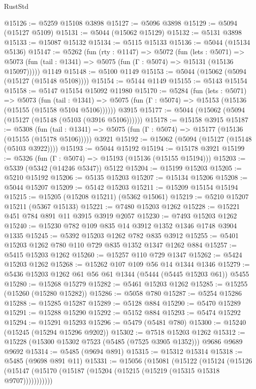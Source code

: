 \begin{lexlean}{RustStd}
\begin{coremodule}
@15126 := @5259 @15108 @3898
@15127 := @5096 @3898
@15129 := @5094 (@15127 @5109)
@15131 := @5044 (@15062 @15129)
@15132 := @5131 @3898
@15133 := @15087 @15132
@15134 := @5115 @15133
@15136 := @5044 (@15134 @5136)
@15147 := @5262
    (fun (rty : @1147) =>
    @5072
      (fun (lets : @5071) =>
      @5073 (fun (tail : @1341) => @5075 (fun (Γ : @5074) => @15131 (@15136 @15097)))))
    @1149
@15148 := @5100 @1149
@15153 := @5044 (@15062 (@5094 (@15127 (@15148 @5108))))
@15154 := @5144 @1149
@15155 := @5143 @15154
@15158 := @5147 @15154 @15092 @11980
@15170 := @5284
    (fun (lets : @5071) =>
    @5073
      (fun (tail : @1341) =>
      @5075 (fun (Γ : @5074) => @15153 (@15136 (@15155 (@15158 @5104 @5106))))))
    @3915
@15177 := @5044 (@15062 (@5094 (@15127 (@15148 (@5103 (@3916 @5106))))))
@15178 := @15158 @3915
@15187 := @5308
    (fun (tail : @1341) => @5075 (fun (Γ : @5074) => @15177 (@15136 (@15155 (@15178 @5106)))))
    @3921
@15192 := @15062 (@5094 (@15127 (@15148 (@5103 @3922))))
@15193 := @5044 @15192
@15194 := @15178 @3921
@15199 := @5326 (fun (Γ : @5074) => @15193 (@15136 (@15155 @15194)))
@15203 := @5339 (@5342 (@14246 @5347)) @5122
@15204 := @15199 @15203
@15205 := @5210 @15192
@15206 := @5135 @15203
@15207 := @15134 @15206
@15208 := @5044 @15207
@15209 := @5142 @15203
@15211 := @15209 @15154 @15194
@15215 := @15205 (@15208 @15211) (@5362 @15061)
@15219 := @5210 @15207 @15211 (@5367 @15133)
@15221 := @7480 @15203 @1262
@15228 := @15221 @451 @784 @891 @11 @3915 @3919 @2057
@15230 := @7493 @15203 @1262
@15240 := @15230 @782 @109 @835 @14 @3912 @1352 @1346 @1748 @3904 @1335
@15245 := @5392 @15203 @1262 @782 @835 @3912
@15255 := @5401 @15203 @1262 @780 @110 @729 @835 @1352 @1347 @1262 @884
@15257 := @5415 @15203 @1262
@15260 := @15257 @110 @729 @1347
@15262 := @5424 @15203 @1262
@15268 := @15262 @107 @109 @56 @14 @1344 @1346
@15279 := @5436 @15203 @1262 @61 @56 @61 @1344 (@5444 (@5445 @15203 @61)) @5455
@15280 := @15268 @15279
@15282 := @5461 @15203 @1262
@15285 := @15255 (@15260 (@15280 @15282))
@15286 := @5058 @780
@15287 := @5254 @15286
@15288 := @15285 @15287
@15289 := @5128 @884
@15290 := @5470 @15289
@15291 := @15288 @15290
@15292 := @5152 @884
@15293 := @5474 @15292
@15294 := @15291 @15293
@15296 := @5479 (@5481 @780)
@15300 := @15240 (@15245 (@15294 @15296 @9202))
@15302 := @7518 @15203 @1262
@15312 := @15228 (@15300 @15302 @7523 (@5485 (@7525 @3905 @1352))) @9686 @9689 @9692
@15314 := @5485 (@9694 @891)
@15315 := @15312 @15314
@15318 := @5485 (@9698 @891 @11)
@15331 := @15056
    (@15081
      (@15122
        (@15124
          (@15126 (@15147 (@15170 (@15187 (@15204 (@15215 (@15219 (@15315 @15318 @9707)))))))))))

\end{coremodule}
\end{lexlean}
